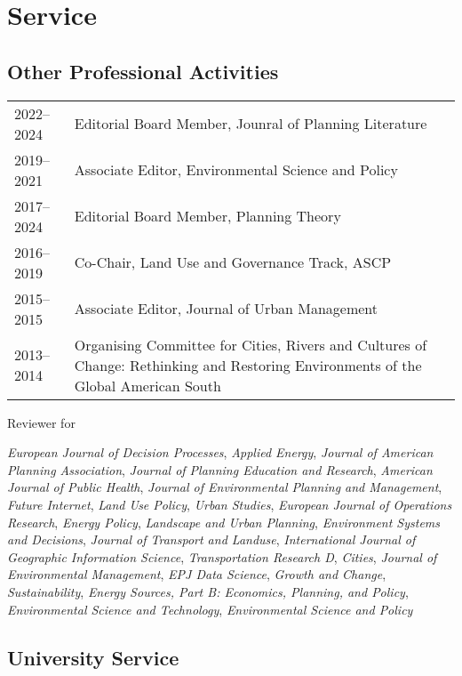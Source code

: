 \documentclass[11pt,a4paper,]{awesome-cv}
\begin{document}
\section{Service}\label{service}

\subsection{Other Professional
Activities}\label{other-professional-activities}

\begin{tabular}{lp{11.3cm}}
  2022--2024 & Editorial Board Member, Jounral of Planning Literature \\ 
  2019--2021 & Associate Editor, Environmental Science and Policy \\ 
  2017--2024 & Editorial Board Member, Planning Theory \\ 
  2016--2019 & Co-Chair, Land Use and Governance Track, ASCP \\ 
  2015--2015 & Associate Editor, Journal of Urban Management \\ 
  2013--2014 & Organising Committee for Cities, Rivers and Cultures of Change: Rethinking and Restoring Environments of the Global American South \\ 
  \end{tabular}

Reviewer for

\emph{European Journal of Decision Processes}, \emph{Applied Energy},
\emph{Journal of American Planning Association},
\emph{Journal of Planning Education and Research},
\emph{American Journal of Public Health},
\emph{Journal of Environmental Planning and Management},
\emph{Future Internet}, \emph{Land Use Policy}, \emph{Urban Studies},
\emph{European Journal of Operations Research}, \emph{Energy Policy},
\emph{Landscape and Urban Planning},
\emph{Environment Systems and Decisions},
\emph{Journal of Transport and Landuse},
\emph{International Journal of Geographic Information Science},
\emph{Transportation Research D}, \emph{Cities},
\emph{Journal of Environmental Management}, \emph{EPJ Data Science},
\emph{Growth and Change}, \emph{Sustainability},
\emph{Energy Sources, Part B: Economics, Planning, and Policy},
\emph{Environmental Science and Technology},
\emph{Environmental Science and Policy}

\subsection{University Service}\label{university-service}
\end{document}

